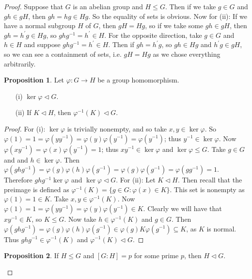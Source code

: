 \documentclass[9pt,reqno]{amsart}
\theoremstyle{definition}
\newtheorem{prop}{Proposition}[section]
\newcommand{\pp}{\prime}
\begin{document}
\begin{proof}
	Suppose that $G$ is an abelian group and $H \leq G$. Then if we take $g \in G$ and $gh \in gH$, then $gh = hg \in Hg$. So the equality of sets is obvious. Now for (ii): If we have a normal subgroup $H$ of $G$, then $gH = Hg$, so if we take some $gh \in gH$, then $gh = h^\pp g \in Hg$, so $ghg^{-1} = h^\pp \in H$. For the opposite direction, take $g \in G$ and $h \in H$ and suppose $ghg^{-1} = h^\pp \in H$. Then if $gh = h^\pp g$, so $gh \in Hg$ and $h^\pp g \in gH$, so we can see a containment of sets, i.e. $gH = Hg$ as we chose everything arbitrarily. 
	
	\begin{prop}
		Let $\varphi \colon G \to H$ be a group homomorphism.
		\begin{itemize}
			\item [(i)] $\ker \varphi \lhd G$. 
			\item [(ii)] If $K \lhd H$, then $\varphi^{-1} (K) \lhd G$. 
		\end{itemize}
	\end{prop}
	\begin{proof}
		For (i): $\ker \varphi$ is trivially nonempty, and so take $x, y\in \ker \varphi$. So $\varphi(1) =1 =  \varphi (y y^{-1}) = \varphi (y) \varphi(y^{-1})  = \varphi(y^{-1})$; thus $y^{-1} \in \ker \varphi$. Now $\varphi (xy^{-1}) = \varphi (x) \varphi(y^{-1}) = 1$; thus $xy^{-1} \in \ker \varphi$ and $\ker \varphi \leq G$. Take $g \in G$ and and $h \in \ker \varphi$. Then $\varphi(ghg^{-1} )= \varphi(g)\varphi(h)\varphi(g^{-1}) = \varphi(g)\varphi(g^{-1}) = \varphi(gg^{-1}) = 1$. Therefore $ghg^{-1} \ker \varphi$ and $\ker \varphi \lhd G$. 
		For (ii): Let $K \lhd H$. Then recall that the preimage is defined as $\varphi^{-1}(K) = \{ g \in G \colon \varphi(x) \in K \}$. This set is nonempty as $\varphi(1)  = 1\in K$. Take $x, y \in \varphi^{-1}(K) $. Now $\varphi (1) = 1=  \varphi(y y^{-1}) = \varphi (y)\varphi (y^{-1}) \in K$. Clearly we will have that $xy^{-1} \in K$, so $K \leq G$. Now take $h \in \varphi^{-1} (K)$ and $g \in G$. Then $\varphi (ghg^{-1}) = \varphi(g) \varphi (h) \varphi (g^{-1}) \in \varphi (g) K \varphi(g^{-1}) \subseteq K$, as $K$ is normal. Thus $ghg^{-1} \in \varphi^{-1} (K)$ and $\varphi^{-1} (K) \lhd G$. 
	\end{proof}
	\begin{prop}
		If $H \leq G$ and $[G \colon H] = p$ for some prime $p$, then $H \lhd G$. 
	\end{prop}
	
	

\end{proof}
\end{document}
